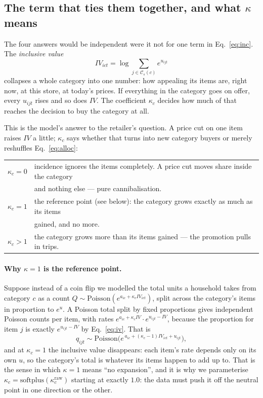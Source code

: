 \documentclass[11pt]{article}
\begin{document}
\subsection{The term that ties them together, and what \texorpdfstring{$\kappa$}{kappa} means}
\label{sec:nest}

The four answers would be independent were it not for one term in Eq.~\ref{eq:inc}. The
\emph{inclusive value}
\begin{equation}
IV_{ict}=\log\!\!\sum_{j\in\mathcal{C}_s(c)}\!\! e^{u_{ijt}}
\label{eq:iv}
\end{equation}
collapses a whole category into one number: how appealing its items are, right now, at
this store, at today's prices. If everything in the category goes on offer, every
$u_{ijt}$ rises and so does $IV$. The coefficient $\kappa_c$ decides how much of that
reaches the decision to buy the category at all.

This is the model's answer to the retailer's question. A price cut on one item raises
$IV$ a little; $\kappa_c$ says whether that turns into new category buyers or merely
reshuffles Eq.~\ref{eq:alloc}:

\begin{center}
\begin{tabular}{ll}
\toprule
$\kappa_c=0$ & incidence ignores the items completely. A price cut moves share inside the
category \\ & and nothing else --- pure cannibalisation. \\
$\kappa_c=1$ & the reference point (see below): the category grows exactly as much as its
items \\ & gained, and no more. \\
$\kappa_c>1$ & the category grows more than its items gained --- the promotion pulls in
trips. \\
\bottomrule
\end{tabular}
\end{center}

\paragraph{Why $\kappa=1$ is the reference point.} Suppose instead of a coin flip we
modelled the total units a household takes from category $c$ as a count
$Q\sim\mathrm{Poisson}(e^{a_{ic}+\kappa_c IV_{ict}})$, split across the category's items in
proportion to $e^{u}$. A Poisson total split by fixed proportions gives independent
Poisson counts per item, with rates $e^{a_{ic}+\kappa_c IV}\cdot e^{u_{ijt}-IV}$, because
the proportion for item $j$ is exactly $e^{u_{ijt}-IV}$ by Eq.~\ref{eq:iv}. That is
\begin{equation}
q_{ijt}\sim\mathrm{Poisson}\bigl(e^{\,a_{ic}+(\kappa_c-1)IV_{ict}+u_{ijt}}\bigr),
\label{eq:kappa1}
\end{equation}
and at $\kappa_c=1$ the inclusive value disappears: each item's rate depends only on its
own $u$, so the category's total is whatever its items happen to add up to. That is the
sense in which $\kappa=1$ means ``no expansion'', and it is why we parameterise
$\kappa_c=\mathrm{softplus}(\kappa^{\mathrm{raw}}_c)$ starting at exactly $1.0$: the data
must push it off the neutral point in one direction or the other.
\end{document}
